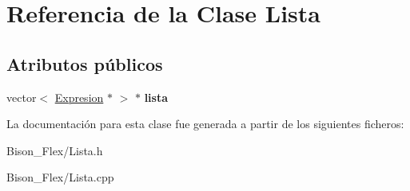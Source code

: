 \hypertarget{class_lista}{\section{Referencia de la Clase Lista}
\label{class_lista}
}
\subsection*{Atributos públicos}
\begin{DoxyCompactItemize}
\item 
\hypertarget{class_lista_ab717ea9786ada3e085c9e7c64a362cc3}{vector$<$ \hyperlink{class_expresion}{Expresion} $\ast$ $>$ $\ast$ {\bfseries lista}}\label{class_lista_ab717ea9786ada3e085c9e7c64a362cc3}

\end{DoxyCompactItemize}


La documentación para esta clase fue generada a partir de los siguientes ficheros\-:\begin{DoxyCompactItemize}
\item 
Bison\-\_\-\-Flex/Lista.\-h\item 
Bison\-\_\-\-Flex/Lista.\-cpp\end{DoxyCompactItemize}

